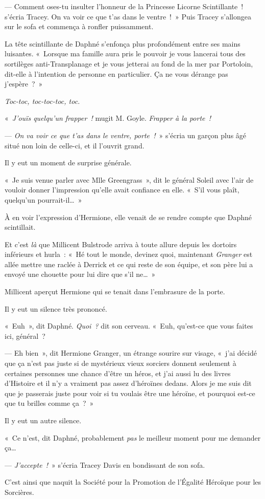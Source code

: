 --- Comment oses-tu insulter l'honneur de la Princesse Licorne Scintillante~! s'écria Tracey. On va voir ce que t'as dans le ventre~!~» Puis Tracey s'allongea sur le sofa et commença à ronfler puissamment.

La tête scintillante de Daphné s'enfonça plus profondément entre ses mains luisantes. «~Lorsque ma famille aura pris le pouvoir je vous lancerai tous des sortilèges anti-Transplanage et je vous jetterai au fond de la mer par Portoloin, dit-elle à l'intention de personne en particulier. Ça ne vous dérange pas j'espère~?~»

\emph{Toc-toc, toc-toc-toc, toc.}

«~\emph{J'ouïs quelqu'un frapper~!} mugit M. Goyle. \emph{Frapper à la porte~!}

--- \emph{On va voir ce que t'as dans le ventre, porte~!}~» s'écria un garçon plus âgé situé non loin de celle-ci, et il l'ouvrit grand.

Il y eut un moment de surprise générale.

«~Je suis venue parler avec Mlle Greengrass~», dit le général Soleil avec l'air de vouloir donner l'impression qu'elle avait confiance en elle. «~S'il vous plaît, quelqu'un pourrait-il…~»

À en voir l'expression d'Hermione, elle venait de se rendre compte que Daphné scintillait.

Et c'est \emph{là} que Millicent Bulstrode arriva à toute allure depuis les dortoirs inférieurs et hurla~: «~Hé tout le monde, devinez quoi, maintenant \emph{Granger} est allée mettre une raclée à Derrick et ce qui reste de son équipe, et son père lui a envoyé une chouette pour lui dire que s'il ne…~»

Millicent aperçut Hermione qui se tenait dans l'embrasure de la porte.

Il y eut un silence très prononcé.

«~Euh~», dit Daphné. \emph{Quoi~?} dit son cerveau. «~Euh, qu'est-ce que vous faites ici, général~?

--- Eh bien~», dit Hermione Granger, un étrange sourire sur visage, «~j'ai décidé que ça n'est pas juste si de mystérieux vieux sorciers donnent seulement à certaines personnes une chance d'être un héros, et j'ai aussi lu des livres d'Histoire et il n'y a vraiment pas assez d'héroïnes dedans. Alors je me suis dit que je passerais juste pour voir si tu voulais être une héroïne, et pourquoi est-ce que tu brilles comme ça~?~»

Il y eut un autre silence.

«~Ce n'est, dit Daphné, probablement \emph{pas} le meilleur moment pour me demander ça…

--- \emph{J'accepte~!}~» s'écria Tracey Davis en bondissant de son sofa.

\later

C'est ainsi que naquit la Société pour la Promotion de l'Égalité Héroïque pour les Sorcières.
